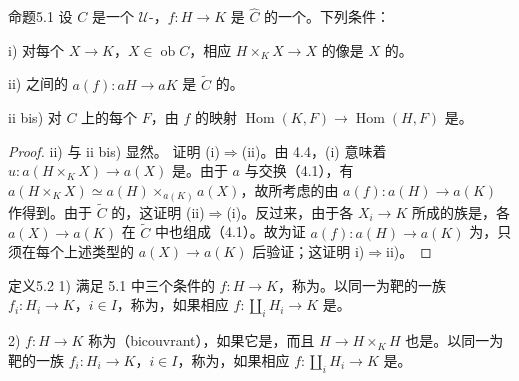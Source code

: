 \begin{SGAresult}{命题}{5.1}
设 $C$ 是一个 $\mathcal U$-，$f:H\to K$ 是 $\widehat C$ 的一个。下列条件：
\par i) 对每个 $X\to K$，$X\in\operatorname{ob}C$，相应 $H\times_KX\to X$ 的像是 $X$ 的。
\par ii) 之间的 $a(f):aH\to aK$ 是 $\widetilde C$ 的。
\par ii bis) 对 $C$ 上的每个 $F$，由 $f$ 的映射 $\operatorname{Hom}(K,F)\to\operatorname{Hom}(H,F)$ 是。
\end{SGAresult}
\begin{proof}
ii) 与 ii bis) 显然。
证明 (i)$\Rightarrow$(ii)。由 4.4，(i) 意味着 $u:a(H\times_KX)\to a(X)$ 是。由于 $a$ 与交换（4.1），有 $a(H\times_KX)\simeq a(H)\times_{a(K)}a(X)$，故所考虑的由 $a(f):a(H)\to a(K)$ 作得到。由于 $\widetilde C$ 的，这证明 (ii)$\Rightarrow$(i)。反过来，由于各 $X_i\to K$ 所成的族是，各 $a(X)\to a(K)$ 在 $\widetilde C$ 中也组成（4.1）。故为证 $a(f):a(H)\to a(K)$ 为，只须在每个上述类型的 $a(X)\to a(K)$ 后验证；这证明 i)$\Rightarrow$ii)。
\end{proof}
\begin{SGAresult}{定义}{5.2}
1) 满足 5.1 中三个条件的 $f:H\to K$，称为。以同一为靶的一族 $f_i:H_i\to K$，$i\in I$，称为，如果相应 $f:\coprod_iH_i\to K$ 是。
\par 2)  $f:H\to K$ 称为（bicouvrant），如果它是，而且 $H\to H\times_KH$ 也是。以同一为靶的一族 $f_i:H_i\to K$，$i\in I$，称为，如果相应 $f:\coprod_iH_i\to K$ 是。
\end{SGAresult}
